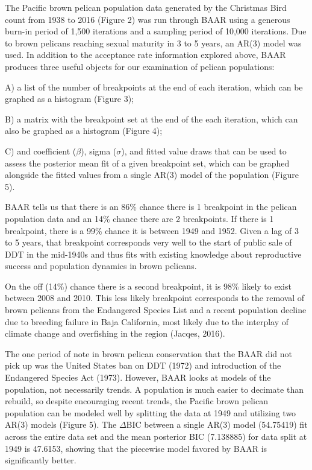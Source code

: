 \documentclass[submit]{smj}
\begin{document}
The Pacific brown pelican population data generated by the Christmas Bird count from 1938 to 2016 (Figure 2) was run through BAAR using a generous burn-in period of 1,500 iterations and a sampling period of 10,000 iterations. Due to brown pelicans reaching sexual maturity in 3 to 5 years, an AR(3) model was used. In  addition to the acceptance rate information explored above, BAAR produces three useful objects for our examination of pelican populations:

A) a list of the number of breakpoints at the end of each iteration, which can be graphed as a histogram (Figure 3);

B) a matrix with the breakpoint set at the end of the each iteration, which can also be graphed as a histogram (Figure 4);

C) and coefficient ($\beta$), sigma ($\sigma$), and fitted value draws that can be used to assess the posterior mean fit of a given breakpoint set, which can be graphed alongside the fitted values from a single AR(3) model of the population (Figure 5).

	BAAR tells us that there is an 86\% chance there is 1 breakpoint in the pelican population data and an 14\% chance there are 2 breakpoints. If there is 1 breakpoint, there is a 99\% chance it is between 1949 and 1952. Given a lag of 3 to 5 years, that breakpoint corresponds very well to the start of public sale of DDT in the mid-1940s and thus fits with existing knowledge about reproductive success and population dynamics in brown pelicans.
	
	On the off (14\%) chance there is a second breakpoint, it is 98\% likely to exist between 2008 and 2010. This less likely breakpoint corresponds to the removal of brown pelicans from the Endangered Species List and a recent population decline due to breeding failure in Baja California, most likely due to the interplay of climate change and overfishing in the region (Jacqes, 2016).
	
	The one period of note in brown pelican conservation that the BAAR did not pick up was the United States ban on DDT (1972) and introduction of the Endangered Species Act (1973). However, BAAR looks at models of the population, not necessarily trends. A population is much easier to decimate than rebuild, so despite encouraging recent trends, the Pacific brown pelican population can be modeled well by splitting the data at 1949 and utilizing two AR(3) models (Figure 5). The $\Delta$BIC between a single AR(3) model (54.75419) fit across the entire data set and the mean posterior BIC (7.138885) for data split at 1949 is 47.6153, showing that the piecewise model favored by BAAR is significantly better. 
	
\end{document}
